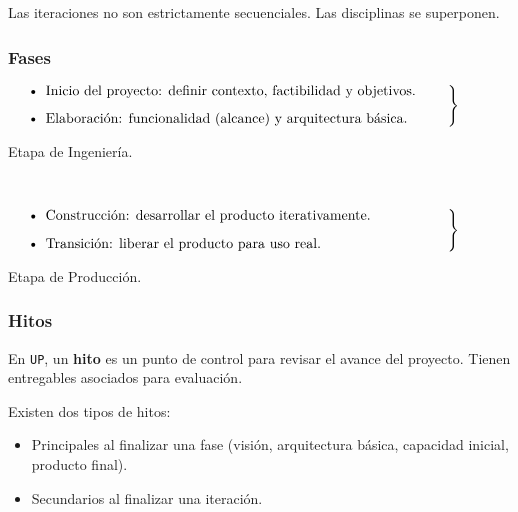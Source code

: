 \documentclass[]{article}
\begin{document}
Las iteraciones no son estrictamente secuenciales. Las disciplinas se superponen.

\subsubsection{Fases}

$\left.\begin{minipage}{11cm}
\begin{itemize}
	\item Inicio del proyecto: definir contexto, factibilidad y objetivos.
	\item Elaboración: funcionalidad (alcance) y arquitectura básica.
\end{itemize}
\end{minipage}\right\rbrace$
\begin{minipage}{10cm}
Etapa de Ingeniería.
\end{minipage}

~\newline\vspace{-0.2cm}

$\left.\begin{minipage}{11cm}
\begin{itemize}
	\item Construcción: desarrollar el producto iterativamente.
	\item Transición: liberar el producto para uso real.
\end{itemize}
\end{minipage}\right\rbrace$
\begin{minipage}{10cm}
Etapa de Producción.
\end{minipage}


\subsubsection{Hitos}
En \texttt{UP}, un \textbf{hito} es un punto de control para revisar el avance del proyecto. Tienen entregables asociados para evaluación.

Existen dos tipos de hitos:
\begin{itemize}
	\item Principales al finalizar una fase (visión, arquitectura básica, capacidad inicial, producto final).
	\item Secundarios al finalizar una iteración.
\end{itemize}
\end{document}
